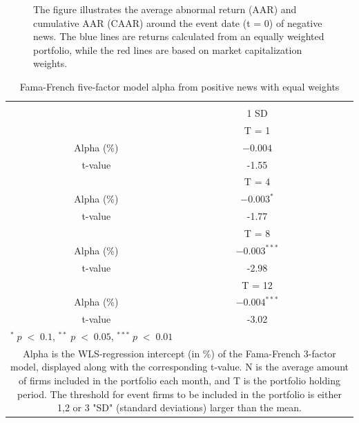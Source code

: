 \begin{figure} [H]
\begin{minipage}[b]{0.49\textwidth}
    \label{fig:ST_pos_sensitivity_nasdaq_ESG}
     \end{minipage}
        \caption*{\footnotesize The figure illustrates the average abnormal return (AAR) and cumulative AAR (CAAR) around the event date (t = 0) of negative news. The blue lines are returns calculated from an equally weighted portfolio, while the red lines are based on market capitalization weights.}
        \label{fig:three graphs}
\end{figure}













\setlength{\tabcolsep}{15pt}
\begin{table}[]
\small
\centering
\caption{Fama-French five-factor model alpha from positive news with equal weights} 
\begin{tabular}{ccccc}
\hline \hline \\ 
 &     &  &    1 SD  & \\ \cline{3-4}
& & &  T = 1 & \\ \cline{3-4}
& Alpha (\%)  &  & $ -0.004$  &  \\
& t-value &  & -1.55 &  \\
& & &  T = 4 & \\ \cline{3-4}
& Alpha (\%)  &  & $ -0.003^{*}$  & \\
& t-value & & -1.77  &  \\
& & &  T = 8 & \\ \cline{3-4}
& Alpha (\%)  &  & $ -0.003^{***}$   &  \\
& t-value &  & -2.98  & \\
&  & &  T = 12 & \\ \cline{3-4}
& Alpha (\%)  &  & $ -0.004^{***}$  &  \\
& t-value &  & -3.02  & \\
\hline \hline
 \multicolumn{5}{l}{ \footnotesize $^* \; p\; <\; 0.1$, $ ^{**} \; p\; <\; 0.05$, $ ^{***} \; p\; <\; 0.01$  } \\
 \multicolumn{5}{p{11.5cm}}{ \footnotesize Alpha is the WLS-regression intercept (in \%) of the Fama-French 3-factor model, displayed along with the corresponding t-value. N is the average amount of firms included in the portfolio each month, and T is the portfolio holding period. The threshold for event firms to be included in the portfolio is either 1,2 or 3 "SD" (standard deviations) larger than the mean.}  \\ 
\end{tabular}
\label{tab: FF5_pos_equalW}
\end{table}


